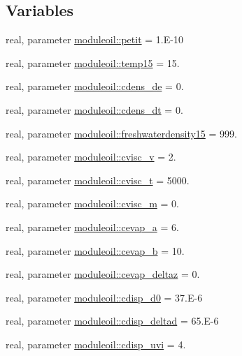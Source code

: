 \subsection*{Variables}
\begin{DoxyCompactItemize}
\item 
real, parameter \mbox{\hyperlink{namespacemoduleoil_a4c54c8c5599a96c18dbcd275ad63854a}{moduleoil\+::petit}} = 1.\+E-\/10
\item 
real, parameter \mbox{\hyperlink{namespacemoduleoil_a4755b7333b284419e721926797d7d9cc}{moduleoil\+::temp15}} = 15.
\item 
real, parameter \mbox{\hyperlink{namespacemoduleoil_abdd514937ab9c47037f4547fd9228fad}{moduleoil\+::cdens\+\_\+de}} = 0.
\item 
real, parameter \mbox{\hyperlink{namespacemoduleoil_aca63c50e0dbeec5aa0697522643eeb66}{moduleoil\+::cdens\+\_\+dt}} = 0.
\item 
real, parameter \mbox{\hyperlink{namespacemoduleoil_aa67faf2d733fc126badfa6826889d04b}{moduleoil\+::freshwaterdensity15}} = 999.
\item 
real, parameter \mbox{\hyperlink{namespacemoduleoil_a17328240dfe3a5164beda37e30975304}{moduleoil\+::cvisc\+\_\+v}} = 2.
\item 
real, parameter \mbox{\hyperlink{namespacemoduleoil_a5144615100792e9b403610892988a8a1}{moduleoil\+::cvisc\+\_\+t}} = 5000.
\item 
real, parameter \mbox{\hyperlink{namespacemoduleoil_aeea5bdbe646124d8bd397fbe5a223fb6}{moduleoil\+::cvisc\+\_\+m}} = 0.
\item 
real, parameter \mbox{\hyperlink{namespacemoduleoil_a7ad579a5168861e86017221575d0b313}{moduleoil\+::cevap\+\_\+a}} = 6.
\item 
real, parameter \mbox{\hyperlink{namespacemoduleoil_a507a8e87d7d8d36e3b6b1f7ad9ca5698}{moduleoil\+::cevap\+\_\+b}} = 10.
\item 
real, parameter \mbox{\hyperlink{namespacemoduleoil_a5bedad0e5aa6ea6de8fbe130790ddcae}{moduleoil\+::cevap\+\_\+deltaz}} = 0.
\item 
real, parameter \mbox{\hyperlink{namespacemoduleoil_acde44825165b6fc78cec36ab327d519e}{moduleoil\+::cdisp\+\_\+d0}} = 37.\+E-\/6
\item 
real, parameter \mbox{\hyperlink{namespacemoduleoil_a26b3cfcf7bdde168be0e28fe85ef9054}{moduleoil\+::cdisp\+\_\+deltad}} = 65.\+E-\/6
\item 
real, parameter \mbox{\hyperlink{namespacemoduleoil_ae89ac5ef3bc360e058289d7370564447}{moduleoil\+::cdisp\+\_\+uvi}} = 4.

\end{DoxyCompactItemize}
